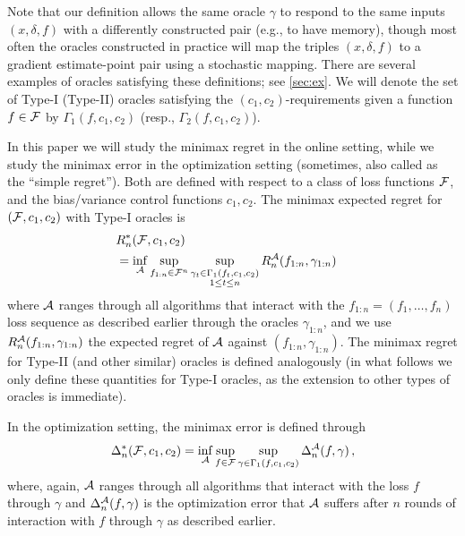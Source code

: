 Note that our definition allows the same oracle $\gamma$ to respond to the same inputs $(x,\delta,f)$ with a differently constructed pair (e.g., to have memory), 
though most often the oracles constructed in practice 
will map the triples $(x,\delta,f)$ to a gradient estimate-point pair using a stochastic mapping.
There are several examples of oracles satisfying these definitions; see \cref{sec:ex}.
We will denote the set of Type-I (Type-II) oracles satisfying the $(c_1,c_2)$-requirements given a function $f\in \mathcal{F}$ by $\Gamma_1(f,c_1,c_2)$ (resp., $\Gamma_2(f,c_1,c_2)$). 

In this paper we will study the minimax regret in the online setting, while we study the minimax error in the optimization setting (sometimes, also called as the ``simple regret'').
Both are defined with respect to a class of loss functions $\mathcal{F}$, and the bias/variance control functions $c_1,c_2$.
The minimax expected regret for $(\mathcal{F},c_1,c_2)$ with Type-I oracles is
\begin{align}
\lefteqn{R_n^*(\cF,c_1,c_2) } \nonumber \\
&= \inf_{\cA} \sup_{f_{1:n}\in \cF^n} 
	\sup_{\substack{\gamma_t \in \Gamma_1(f_t,c_1,c_2)\\1\le t \le n}} R_n^{\cA}(f_{1:n},\gamma_{1:n})
\label{eq:minimaxregdef}
\end{align}
where $\mathcal{A}$ ranges through all algorithms that interact with the $f_{1:n}= (f_1,\dots,f_n)$ loss sequence
as described earlier
through the oracles $\gamma_{1:n}$,
and we use $R_n^{\mathcal{A}}(f_{1:n},\gamma_{1:n})$ the expected regret of $\mathcal{A}$ against $(f_{1:n},\gamma_{1:n})$.
The minimax regret for Type-II (and other similar) oracles is defined analogously (in what follows we only define these quantities for Type-I oracles, as the extension to other types of oracles is immediate).

In the optimization setting, the minimax error is defined through
\begin{align}
\label{eq:minimaxerrdef}
\Delta_n^*(\mathcal{F},c_1,c_2)
= \inf_{\mathcal{A}} \sup_{f \in \mathcal{F}} \sup_{\gamma\in \Gamma_1(f,c_1,c_2)}  \Delta_n^{\mathcal{A}}(f,\gamma)\,,
\end{align}
where, again, $\mathcal{A}$ ranges through all algorithms that interact with the loss $f$ through $\gamma$ and 
$\Delta_n^{\mathcal{A}}(f,\gamma)$ is the optimization error that $\mathcal{A}$ suffers 
after $n$ rounds of interaction with $f$ through $\gamma$ as described earlier.

